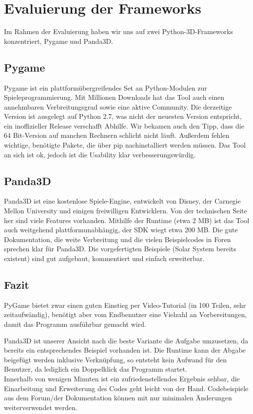 \documentclass[12pt,a4paper,oneside,ngerman]{scrartcl}
\begin{document}
\section{Evaluierung der Frameworks}
Im Rahmen der Evaluierung haben wir uns auf zwei Python-3D-Frameworks konzentriert, Pygame und Panda3D.
\subsection{Pygame}
Pygame ist ein plattformübergreifendes Set an Python-Modulen zur Spieleprogrammierung. Mit Millionen Downloads hat das Tool auch einen annehmbaren Verbreitungsgrad sowie eine aktive Community. Die derzeitige Version ist ausgelegt auf Python 2.7, was nicht der neuesten Version entspricht, ein inoffizieller Release verschafft Abhilfe. Wir bekamen auch den Tipp, dass die 64 Bit-Version auf manchen Rechnern schlicht nicht läuft. Außerdem fehlen wichtige, benötigte Pakete, die über pip nachinstalliert werden müssen. Das Tool an sich ist ok, jedoch ist die Usability klar verbesserungswürdig.

\subsection{Panda3D}
Panda3D ist eine kostenlose Spiele-Engine, entwickelt von Disney, der Carnegie Mellon University und einigen freiwilligen Entwicklern. Von der technischen Seite her sind viele Features vorhanden. Mithilfe der Runtime (etwa 2 MB) ist das Tool auch weitgehend plattformunabhängig, der SDK wiegt etwa 200 MB. Die gute Dokumentation, die weite Verbreitung und die vielen Beispielcodes in Foren sprechen klar für Panda3D. Die vorgefertigten Beispiele (Solar System bereits existent) sind gut aufgebaut, kommentiert und einfach erweiterbar.

\subsection{Fazit}
PyGame bietet zwar einen guten Einstieg per Video-Tutorial (in 100 Teilen, sehr zeitaufwändig), benötigt aber vom Endbenutzer eine Vielzahl an Vorbereitungen, damit das Programm ausführbar gemacht wird.

Panda3D ist unserer Ansicht nach die beste Variante die Aufgabe umzusetzen, da bereits ein entsprechendes Beispiel vorhanden ist. Die Runtime kann der Abgabe beigefügt werden inklusive Verknüpfung, so entsteht kein Aufwand für den Benutzer, da lediglich ein Doppelklick das Programm startet. \\ 
Innerhalb von wenigen Minuten ist ein zufriedenstellendes Ergebnis sehbar, die Einarbeitung und Erweiterung des Codes geht leicht von der Hand. Codebeispiele aus dem Forum/der Dokumentation können mit nur minimalen Änderungen weiterverwendet werden.
\newpage
\end{document}

